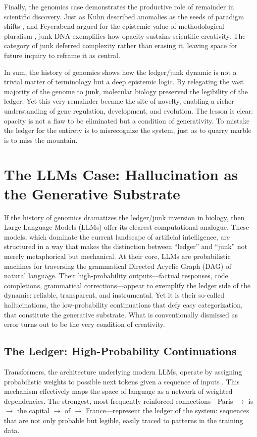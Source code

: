 \documentclass[12pt]{article}
\begin{document}
Finally, the genomics case demonstrates the productive role of remainder in scientific discovery. Just as Kuhn described anomalies as the seeds of paradigm shifts \citep{kuhn1962}, and Feyerabend argued for the epistemic value of methodological pluralism \citep{feyerabend1975}, junk DNA exemplifies how opacity sustains scientific creativity. The category of junk deferred complexity rather than erasing it, leaving space for future inquiry to reframe it as central.

In sum, the history of genomics shows how the ledger/junk dynamic is not a trivial matter of terminology but a deep epistemic logic. By relegating the vast majority of the genome to junk, molecular biology preserved the legibility of the ledger. Yet this very remainder became the site of novelty, enabling a richer understanding of gene regulation, development, and evolution. The lesson is clear: opacity is not a flaw to be eliminated but a condition of generativity. To mistake the ledger for the entirety is to misrecognize the system, just as to quarry marble is to miss the mountain.

\section{The LLMs Case: Hallucination as the Generative Substrate}

If the history of genomics dramatizes the ledger/junk inversion in biology, then Large Language Models (LLMs) offer its clearest computational analogue. These models, which dominate the current landscape of artificial intelligence, are structured in a way that makes the distinction between ``ledger'' and ``junk'' not merely metaphorical but mechanical. At their core, LLMs are probabilistic machines for traversing the grammatical Directed Acyclic Graph (DAG) of natural language. Their high-probability outputs---factual responses, code completions, grammatical corrections---appear to exemplify the ledger side of the dynamic: reliable, transparent, and instrumental. Yet it is their so-called hallucinations, the low-probability continuations that defy easy categorization, that constitute the generative substrate. What is conventionally dismissed as error turns out to be the very condition of creativity.

\subsection{The Ledger: High-Probability Continuations}
Transformers, the architecture underlying modern LLMs, operate by assigning probabilistic weights to possible next tokens given a sequence of inputs \citep{vaswani2017}. This mechanism effectively maps the space of language as a network of weighted dependencies. The strongest, most frequently reinforced connections---Paris $\to$ is $\to$ the capital $\to$ of $\to$ France---represent the ledger of the system: sequences that are not only probable but legible, easily traced to patterns in the training data.
\end{document}
